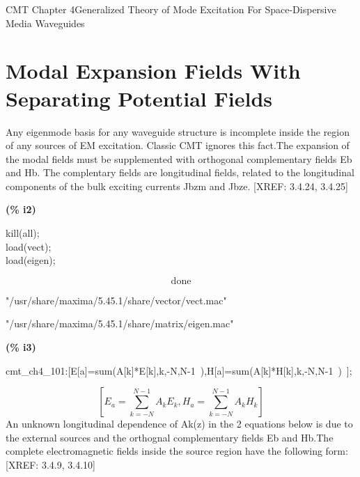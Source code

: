 \documentclass[fleqn]{article}
\begin{document}
CMT Chapter 4Generalized Theory of Mode Excitation For Space-Dispersive Media Waveguides

\section{Modal Expansion Fields With Separating Potential Fields}
Any eigenmode basis for any waveguide structure is incomplete inside the region of any sources of EM excitation. Classic CMT ignores this fact.The expansion  of the  modal fields must be supplemented with orthogonal complementary fields Eb and Hb. The complentary fields are longitudinal fields, related to the longitudinal components of the bulk exciting currents Jbzm and Jbze. [XREF: 3.4.24, 3.4.25]


\noindent
\begin{minipage}[t]{4.000000em}\color{red}\bfseries
(\% i2)	
\end{minipage}
\begin{minipage}[t]{\textwidth}\color{blue}
kill(all);\\
load(vect);\\
load(eigen);
\end{minipage}
\[\displaystyle \tag{\% o0} 
\ensuremath{\mathrm{done
}}\mbox{}\]

\[\tag{\% o1} 
\mbox{}
\]"/usr/share/maxima/5.45.1/share/vector/vect.mac"


\[\tag{\% o2} 
\mbox{}
\]"/usr/share/maxima/5.45.1/share/matrix/eigen.mac"



\noindent
\begin{minipage}[t]{4.000000em}\color{red}\bfseries
(\% i3)	
\end{minipage}
\begin{minipage}[t]{\textwidth}\color{blue}
cmt\_ch4\_101:[E[a]=sum(A[k]*E[k],k,-N,N-1\ ),H[a]=sum(A[k]*H[k],k,-N,N-1\ )\ ];
\end{minipage}
\[\displaystyle \tag{\% o3} 
\left[ {E_a}=\sum_{k=-N}^{N-1}{\left. {A_k} {E_k}\right.}\operatorname{,}{H_a}=\sum_{k=-N}^{N-1}{\left. {A_k} {H_k}\right.}\right] \mbox{}
\]
An unknown longitudinal dependence of Ak(z)  in the 2 equations below is due to the external sources and the orthognal complementary fields Eb and Hb.The complete electromagnetic fields inside the source region have the following form:  [XREF: 3.4.9, 3.4.10]
\end{document}
